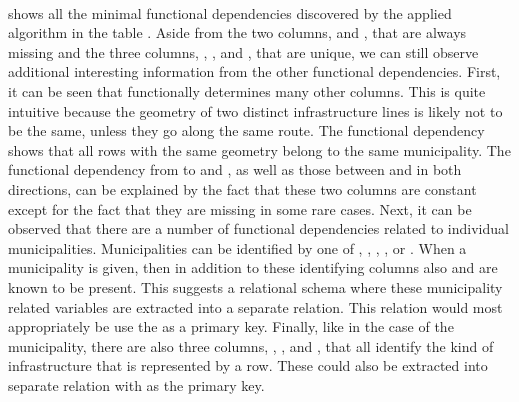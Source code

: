 \paragraph{}
 shows all the minimal functional dependencies discovered by the applied algorithm in the table . Aside from the two columns,  and , that are always missing and the three columns, , , and , that are unique, we can still observe additional interesting information from the other functional dependencies.
First, it can be seen that  functionally determines many other columns. This is quite intuitive because the geometry of two distinct infrastructure lines is likely not to be the same, unless they go along the same route. The functional dependency shows that all rows with the same geometry belong to the same municipality.
The functional dependency from  to  and , as well as those between  and  in both directions, can be explained by the fact that these two columns are constant except for the fact that they are missing in some rare cases.
Next, it can be observed that there are a number of functional dependencies related to individual municipalities. Municipalities can be identified by one of , , , , or . When a municipality is given, then in addition to these identifying columns also  and  are known to be present. This suggests a relational schema where these municipality related variables are extracted into a separate relation. This relation would most appropriately be use the  as a primary key.
Finally, like in the case of the municipality, there are also three columns, , , and , that all identify the kind of infrastructure that is represented by a row. These could also be extracted into separate relation with  as the primary key.

